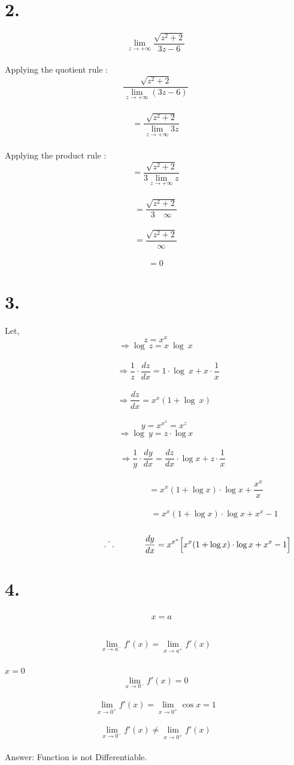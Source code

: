 \documentclass[a4paper]{article}
\begin{document}
\newpage
\section*{2.}

\Large $$ \lim_{z\to +\infty}\frac{\sqrt{z^2+2}}{3z-6} $$
\\
\Large Applying the quotient rule :
\\
\Large $$ \frac{\sqrt{z^2+2}}{\lim_{z\to +\infty}{(3z-6)}} $$
\\
\Large $$=\frac{\sqrt{z^2+2}}{\lim_{z\to +\infty}{3z}} $$
\\
\Large Applying the product rule :
\Large $$=\frac{\sqrt{z^2+2}}{3\lim_{z\to +\infty}{z}} $$
\\
\Large $$=\frac{\sqrt{z^2+2}}{3 \quad\infty} $$
\\
\Large $$=\frac{\sqrt{z^2+2}}{\infty} $$
\\
$$=0$$

\newpage
\section*{3.}
\LARGE \qquad \qquad \qquad Let,
$$ z=x^x $$
$$\Rightarrow \log\ z = x\ \log\ x$$\
$$\qquad \quad \Rightarrow \frac{1}{z} \cdot \frac{dz}{dx}= 1\cdot \log\ x + x \cdot \frac{1}{x}$$\
$$\quad \quad \Rightarrow \frac{dz}{dx} = x^x( 1+\log \ x)$$
\\
$$\qquad y= x^{x^x}= x^z$$
$$\Rightarrow \log \ y = z \cdot \log x$$\
$$ \qquad \qquad \Rightarrow \frac{1}{y} \cdot \frac{dy}{dx} = \frac{dz}{dx}\cdot \log x + z \cdot \frac{1}{x}$$\
$$ \qquad\qquad\qquad\qquad\qquad\qquad = x^x (1+\log x)\cdot \log x + \frac{x^x}{x}$$\
$$ \quad \quad \qquad\qquad\qquad\qquad\qquad\qquad = x^x (1+\log x) \cdot \log x + x^x -1 $$\
$$ \qquad\qquad\quad\qquad\qquad\quad \dot{.\hspace{.095in}.}\hspace{.5in} \frac{dy}{dx} = x^{x^x} \Big[x^x(1+ \log x)\cdot \log x + x^x-1 \Big]$$

\newpage
\section*{4.}
$$\Large \quad x=a $$\\
$$ \lim_{x\to a^-} f'(x) = \lim_{x\to a^+} f'(x) $$\\ \LARGE\qquad\qquad $ x=0 $
$$ \lim_{x\to 0^-} f'(x) = 0 $$\\
$$ \lim_{x\to 0^+} f'(x) = \lim_{x\to 0^+} \cos x = 1$$\\
$$ \lim_{x\to 0^-} f'(x) \neq  \lim_{x\to 0^+} f'(x) $$\\
\LARGE Answer: Function is not Differentiable.
\newpage
\end{document}
